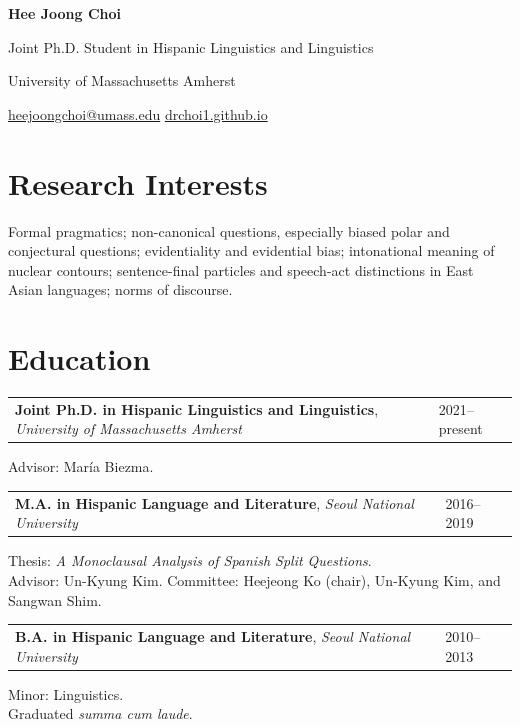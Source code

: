 \documentclass[10pt,letterpaper]{article}
\makeatletter
\newcommand{\datedentry}[2]{%
  \noindent\begin{tabularx}{\textwidth}{@{}X>{\raggedleft\arraybackslash}p{1.45in}@{}}
    #1 & \textcolor{muted}{#2}
  \end{tabularx}\par
}
\newcommand{\subentry}[1]{%
  \hspace*{0.9em}\begin{minipage}{\dimexpr\textwidth-0.9em\relax}
    \small #1
  \end{minipage}\par
}
\newcommand{\educationdetail}[1]{%
  \vspace{-1pt}\subentry{#1}
}
\newcommand{\educationgap}{\vspace{5pt}}
\makeatother
\begin{document}
\begin{center}
  {\LARGE\bfseries Hee Joong Choi}\par
  \vspace{3pt}
  {\normalsize Joint Ph.D. Student in Hispanic Linguistics and Linguistics}\par
  \vspace{2pt}
  University of Massachusetts Amherst\par
  \vspace{4pt}
  \href{mailto:heejoongchoi@umass.edu}{heejoongchoi@umass.edu}
  \enspace\textperiodcentered\enspace
  \href{https://drchoi1.github.io/}{drchoi1.github.io}
\end{center}

\vspace{3pt}

\section{Research Interests}

Formal pragmatics; non-canonical questions, especially biased polar and conjectural questions;
evidentiality and evidential bias; intonational meaning of nuclear contours; sentence-final
particles and speech-act distinctions in East Asian languages; norms of discourse.

\section{Education}

\datedentry{\textbf{Joint Ph.D. in Hispanic Linguistics and Linguistics}, \textit{University of Massachusetts Amherst}}{2021--present}
\educationdetail{Advisor: María Biezma.}


\educationgap
\datedentry{\textbf{M.A. in Hispanic Language and Literature}, \textit{Seoul National University}}{2016--2019}
\educationdetail{Thesis: \textit{A Monoclausal Analysis of Spanish Split Questions}.\\
Advisor: Un-Kyung Kim. Committee: Heejeong Ko (chair), Un-Kyung Kim, and Sangwan Shim.}

\educationgap
\datedentry{\textbf{B.A. in Hispanic Language and Literature}, \textit{Seoul National University}}{2010--2013}
\educationdetail{Minor: Linguistics.\\
Graduated \textit{summa cum laude}.}
\end{document}
